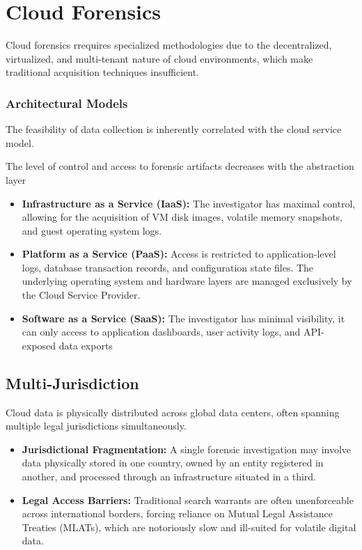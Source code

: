 \section{Cloud Forensics}

Cloud forensics rrequires specialized methodologies due to the decentralized, virtualized, and multi-tenant nature of cloud environments, which make traditional acquisition techniques insufficient.

\subsubsection*{Architectural Models}
The feasibility of data collection is inherently correlated with the cloud service model.
\medskip

\noindent
The level of control and access to forensic artifacts decreases with the abstraction layer
\begin{itemize}
    \item \textbf{Infrastructure as a Service (IaaS):} The investigator has maximal control, allowing for the acquisition of VM disk images, volatile memory snapshots, and guest operating system logs.
    \item \textbf{Platform as a Service (PaaS):} Access is restricted to application-level logs, database transaction records, and configuration state files. The underlying operating system and hardware layers are managed exclusively by the Cloud Service Provider.
    \item \textbf{Software as a Service (SaaS):} The investigator has minimal visibility, it can only access to  application dashboards, user activity logs, and API-exposed data exports
\end{itemize}

\subsection{Multi-Jurisdiction}
Cloud data is physically distributed across global data centers, often spanning multiple legal jurisdictions simultaneously.
\begin{itemize}
    \item \textbf{Jurisdictional Fragmentation:} A single forensic investigation may involve data physically stored in one country, owned by an entity registered in another, and processed through an infrastructure situated in a third.
    \item \textbf{Legal Access Barriers:} Traditional search warrants are often unenforceable across international borders, forcing reliance on Mutual Legal Assistance Treaties (MLATs), which are notoriously slow and ill-suited for volatile digital data.
\end{itemize}

